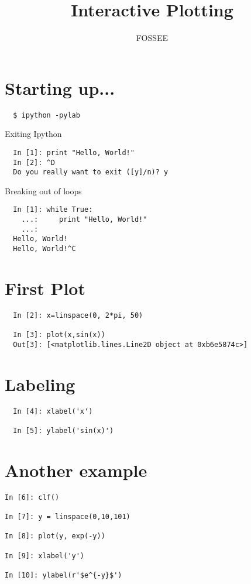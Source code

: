 \documentclass[12pt]{article}
\title{Interactive Plotting}
\author{FOSSEE}
\begin{document}
\maketitle

\section{Starting up...}
\begin{verbatim}
  $ ipython -pylab  
\end{verbatim}
Exiting Ipython
\begin{verbatim}     
  In [1]: print "Hello, World!"
  In [2]: ^D
  Do you really want to exit ([y]/n)? y
\end{verbatim}
Breaking out of loops
\begin{verbatim}     
  In [1]: while True:
    ...:     print "Hello, World!"
    ...:     
  Hello, World!
  Hello, World!^C
\end{verbatim}

\section{First Plot}
\begin{verbatim}
  In [2]: x=linspace(0, 2*pi, 50)

  In [3]: plot(x,sin(x))
  Out[3]: [<matplotlib.lines.Line2D object at 0xb6e5874c>]
\end{verbatim}

\section{Labeling}
\begin{verbatim}
  In [4]: xlabel('x')

  In [5]: ylabel('sin(x)')
\end{verbatim}

\section{Another example}
\begin{verbatim}
In [6]: clf()

In [7]: y = linspace(0,10,101)

In [8]: plot(y, exp(-y))

In [9]: xlabel('y')

In [10]: ylabel(r'$e^{-y}$')
\end{verbatim}
\end{document}
